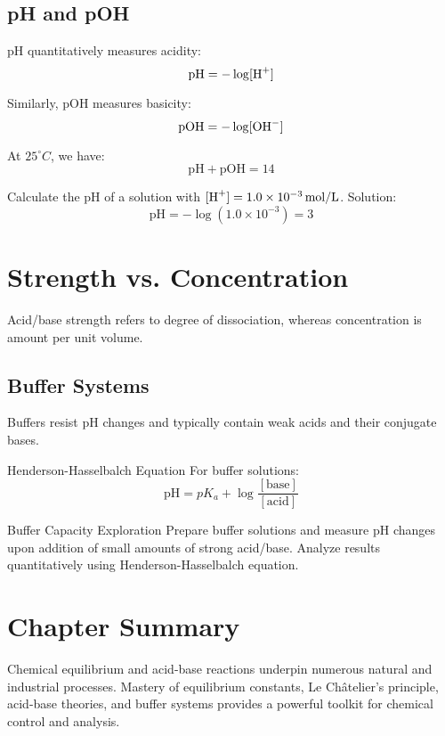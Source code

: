\subsection{pH and pOH}
pH quantitatively measures acidity:
\[
\text{pH} = -\log[\ce{H+}]
\]

Similarly, pOH measures basicity:
\[
\text{pOH} = -\log[\ce{OH-}]
\]

At \(25^\circ C\), we have:
\[
\text{pH} + \text{pOH} = 14
\]

\begin{example}
Calculate the pH of a solution with \(\ce{[H+]} = 1.0 \times 10^{-3}\,\text{mol/L}\).
Solution:
\[
\text{pH} = -\log(1.0 \times 10^{-3}) = 3
\]
\end{example}

\section{Strength vs. Concentration}
Acid/base strength refers to degree of dissociation, whereas concentration is amount per unit volume.

\subsection{Buffer Systems}
Buffers resist pH changes and typically contain weak acids and their conjugate bases.

\begin{keyconcept}{Henderson-Hasselbalch Equation}
For buffer solutions:
\[
\text{pH} = pK_a + \log\frac{[\text{base}]}{[\text{acid}]}
\]
\end{keyconcept}

\begin{investigation}{Buffer Capacity Exploration}
Prepare buffer solutions and measure pH changes upon addition of small amounts of strong acid/base. Analyze results quantitatively using Henderson-Hasselbalch equation.
\end{investigation}

\FloatBarrier

\section*{Chapter Summary}
Chemical equilibrium and acid-base reactions underpin numerous natural and industrial processes. Mastery of equilibrium constants, Le Châtelier's principle, acid-base theories, and buffer systems provides a powerful toolkit for chemical control and analysis.


\FloatBarrier